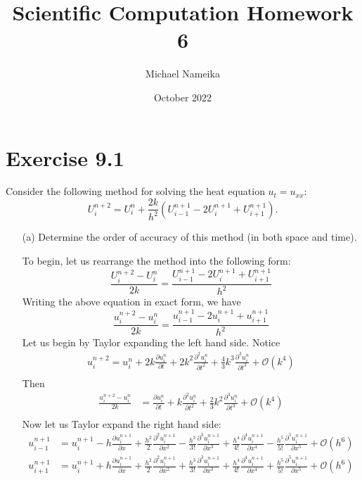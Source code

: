 \documentclass{article}
\title{Scientific Computation Homework 6}
\author{Michael Nameika}
\date{October 2022}
\begin{document}
\maketitle

\section*{Exercise 9.1}
Consider the following method for solving the heat equation $u_t = u_{xx}$:
\[U_i^{n+2} = U_i^n + \frac{2k}{h^2}(U^{n+1}_{i-1} - 2U_i^{n+1} + U_{i+1}^{n+1}).\]
\begin{itemize}
    \item[(a)] Determine the order of accuracy of this method (in both space and time).
    \newline
    
    To begin, let us rearrange the method into the following form:
    \[\frac{U_i^{n+2} - U_i^n}{2k} = \frac{U^{n+1}_{i-1} - 2U_i^{n+1} + U_{i+1}^{n+1}}{h^2}\]
    Writing the above equation in exact form, we have
    \[\frac{u_i^{n+2} - u_i^n}{2k} = \frac{u^{n+1}_{i-1} - 2u_i^{n+1} + u_{i+1}^{n+1}}{h^2}\]
    Let us begin by Taylor expanding the left hand side. Notice
    \begin{align*}
        u_i^{n+2} = u_i^n + 2k \frac{\partial u_i^n}{\partial t} + 2k^2\frac{\partial^2 u_i^n}{\partial t^2} + \frac{4}{3}k^3\frac{\partial^3u_i^n}{\partial t^3} + \mathcal{O}(k^4) \\
    \end{align*}
    Then
    \begin{align*}
        \frac{u_i^{n+2} - u_i^n}{2k} &= \frac{\partial u_i^n}{\partial t} + k\frac{\partial^2u_i^n}{\partial t^2} + \frac{2}{3}k^2\frac{\partial^3u_i^n}{\partial t^3} + \mathcal{O}(k^4) \\
    \end{align*}
    Now let us Taylor expand the right hand side:
    \begin{align*}
        u_{i-1}^{n+1} &= u^{n+1}_i - h\frac{\partial u^{n+1}_i}{\partial x} + \frac{h^2}{2}\frac{\partial^2u_i^{n+1}}{\partial x^2} - \frac{h^3}{3!}\frac{\partial^3u_i^{n+1}}{\partial x^3} + \frac{h^4}{4!}\frac{\partial^4u_i^{n+1}}{\partial x^4} - \frac{h^5}{5!}\frac{\partial^5u_i^{n+1}}{\partial x^5} + \mathcal{O}(h^6) \\
        u_{i+1}^{n+1} &= u^{n+1}_i + h\frac{\partial u^{n+1}_i}{\partial x} + \frac{h^2}{2}\frac{\partial^2u_i^{n+1}}{\partial x^2} + \frac{h^3}{3!}\frac{\partial^3u_i^{n+1}}{\partial x^3} + \frac{h^4}{4!}\frac{\partial^4u_i^{n+1}}{\partial x^4} + \frac{h^5}{5!}\frac{\partial^5u_i^{n+1}}{\partial x^5} + \mathcal{O}(h^6) \\

\end{align*}
\end{itemize}
\end{document}
